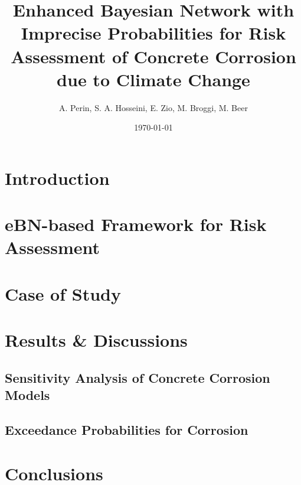 \documentclass{article}
\title{Enhanced Bayesian Network with Imprecise Probabilities for Risk Assessment of Concrete Corrosion due to Climate Change}
\author{A. Perin, S. A. Hosseini, E. Zio, M. Broggi, M. Beer}
\date{\today}
\begin{document}
\maketitle


\begin{abstract}
    
\end{abstract}

\section{Introduction}
    

\section{eBN-based Framework for Risk Assessment}
    
    
\section{Case of Study}
    

\section{Results \& Discussions}
    \subsection{Sensitivity Analysis of Concrete Corrosion Models}
    \subsection{Exceedance Probabilities for Corrosion}

\section{Conclusions}

\newpage

\printbibliography{}
\end{document}
